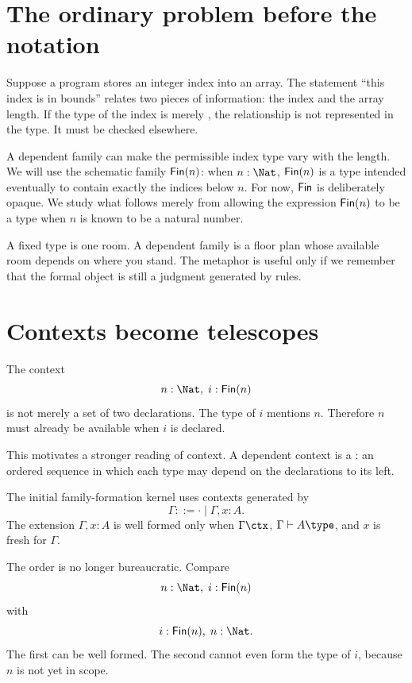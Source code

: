\documentclass[11pt,openany]{book}
\begin{document}
\section{The ordinary problem before the notation}

Suppose a program stores an integer index into an array. The statement ``this index is in bounds'' relates two pieces of information: the index and the array length. If the type of the index is merely , the relationship is not represented in the type. It must be checked elsewhere.

A dependent family can make the permissible index type vary with the length. We will use the schematic family $\mathsf{Fin}(n)$: when $n:\Nat$, $\mathsf{Fin}(n)$ is a type intended eventually to contain exactly the indices below $n$. For now, $\mathsf{Fin}$ is deliberately opaque. We study what follows merely from allowing the expression $\mathsf{Fin}(n)$ to be a type when $n$ is known to be a natural number.

\begin{intuition}
A fixed type is one room. A dependent family is a floor plan whose available room depends on where you stand. The metaphor is useful only if we remember that the formal object is still a judgment generated by rules.
\end{intuition}



\section{Contexts become telescopes}

The context
\[
  n:\Nat,\; i:\Fin(n)
\]
is not merely a set of two declarations. The type of $i$ mentions $n$. Therefore $n$ must already be available when $i$ is declared.

This motivates a stronger reading of context. A dependent context is a : an ordered sequence in which each type may depend on the declarations to its left.

\begin{definition}
The initial family-formation kernel uses contexts generated by
\[
  \Gamma ::= \cdot \mid \Gamma,x:A.
\]
The extension $\Gamma,x:A$ is well formed only when $\Gamma\ctx$, $\Gamma\vdash A\type$, and $x$ is fresh for $\Gamma$.
\end{definition}



The order is no longer bureaucratic. Compare
\[
  n:\Nat,\; i:\Fin(n)
\]
with
\[
  i:\Fin(n),\; n:\Nat.
\]
The first can be well formed. The second cannot even form the type of $i$, because $n$ is not yet in scope.
\end{document}
